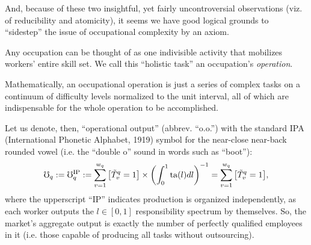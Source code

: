 \documentclass[hidelinks, nonatbib]{elsarticle}
\begin{document}
And, because of these two insightful, yet fairly uncontroversial observations (viz. of reducibility and atomicity), it seems we have good logical grounds to ``sidestep'' the issue of occupational complexity by an axiom.
\begin{axiom}
    \label{woca}
    Any occupation can be thought of as one indivisible activity that mobilizes workers' entire skill set. We call this ``holistic task'' an occupation's \textit{operation}.

    Mathematically, an occupational operation is just a series of complex tasks on a continuum of difficulty levels normalized to the unit interval, all of which are indispensable for the whole operation to be accomplished.
    
    \begin{subaxiom}
        Let us denote, then, ``operational output'' (abbrev. ``o.o.'') with the standard IPA (International Phonetic Alphabet, 1919) symbol for the near-close near-back rounded vowel (i.e. the ``double o'' sound in words such as ``boot''):
        \begin{gather}
            \mho_q
            :=
            \mho_{q}^{\text{IP}}
            :=
            \sum_{v=1}^{w_q}{
                \left[
                    \tilde{T}_{v}^{q}
                    =
                    1
                \right]
                \times
                \left(
                    \int_{0}^{1}{
                        \text{ta}(l)
                        dl
                    }
                \right) ^ {-1}
            }
            =
            \sum_{v=1}^{w_q}{
                \left[
                    \tilde{T}_{v}^{q}
                    =
                    1
                \right]
            }
            ,
        \end{gather}
        where the upperscript ``IP'' indicates production is organized independently, as each worker outputs the $l \in [0,1]$ responsibility spectrum by themselves. So, the market's aggregate output is exactly the number of perfectly qualified employees in it (i.e. those capable of producing all tasks without outsourcing).
        

\end{subaxiom}
\end{axiom}
\end{document}

